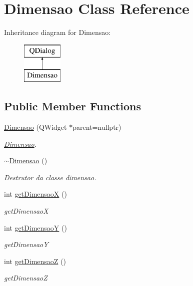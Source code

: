 \hypertarget{classDimensao}{}\section{Dimensao Class Reference}
\label{classDimensao}
Inheritance diagram for Dimensao\+:\begin{figure}[H]
\begin{center}
\leavevmode
\includegraphics[height=2.000000cm]{classDimensao}
\end{center}
\end{figure}
\subsection*{Public Member Functions}
\begin{DoxyCompactItemize}
\item 
\mbox{\hyperlink{classDimensao_a628f34e3842d94b42fc81b30e5652705}{Dimensao}} (Q\+Widget $\ast$parent=nullptr)
\begin{DoxyCompactList}\small\item\em \mbox{\hyperlink{classDimensao}{Dimensao}}. \end{DoxyCompactList}\item 
\mbox{\hyperlink{classDimensao_a54ebe60ff8dcd6452aaa847dd328e8bd}{$\sim$\+Dimensao}} ()
\begin{DoxyCompactList}\small\item\em Destrutor da classe dimensao. \end{DoxyCompactList}\item 
int \mbox{\hyperlink{classDimensao_a212470bd9d76fd1fb31ba816109045d2}{get\+DimensaoX}} ()
\begin{DoxyCompactList}\small\item\em get\+DimensaoX \end{DoxyCompactList}\item 
int \mbox{\hyperlink{classDimensao_a5141fbeb3e622165a1b0a521c5974082}{get\+DimensaoY}} ()
\begin{DoxyCompactList}\small\item\em get\+DimensaoY \end{DoxyCompactList}\item 
int \mbox{\hyperlink{classDimensao_a6a548c7d1634f8b593241c68c74b83c7}{get\+DimensaoZ}} ()
\begin{DoxyCompactList}\small\item\em get\+DimensaoZ \end{DoxyCompactList}\end{DoxyCompactItemize}


